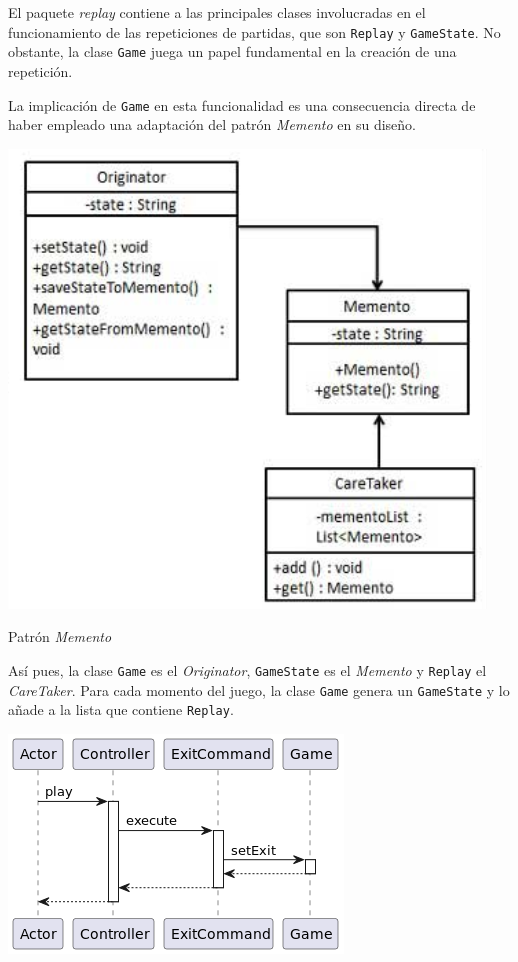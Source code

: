 \documentclass[12pt,a4paper,openright]{book}
\theoremstyle{break}
\begin{document}
El paquete \textit{replay} contiene a las principales clases involucradas en el funcionamiento de las repeticiones de partidas, que son \texttt{Replay} y \texttt{GameState}. No obstante, la clase \texttt{Game} juega un papel fundamental en la creación de una repetición.

La implicación de \texttt{Game} en esta funcionalidad es una consecuencia directa de haber empleado una adaptación del patrón \textit{Memento} en su diseño.

\begin{center}
\includegraphics[scale=0.8]{patronmemento.png}

Patrón \textit{Memento}
\end{center}

Así pues, la clase \texttt{Game} es el \textit{Originator}, \texttt{GameState} es el \textit{Memento} y \texttt{Replay} el \textit{CareTaker}. Para cada momento del juego, la clase \texttt{Game} genera un \texttt{GameState} y lo añade a la lista que contiene \texttt{Replay}.

\begin{center}
\includegraphics[scale=0.7]{addState-replay-sprint-6.png}
\end{center}
\end{document}
